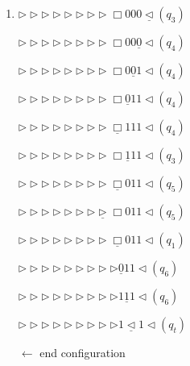 \documentclass[12pt,a4paper]{article}
\makeatletter
\newtheorem*{solution}{Solution}
\theoremstyle{definition}
\renewenvironment{solution}[1][Solution] {\par\pushQED{\qed}\normalfont\topsep6\p@\@plus6\p@\relax\trivlist\item[\hskip\labelsep\bfseries#1\@addpunct{.}]\ignorespaces}{\popQED\endtrivlist\@endpefalse} \makeatother
\makeatother
\begin{document}
\begin{enumerate}
\begin{solution}
\begin{minipage}{0.3\textwidth}
		$\triangleright\triangleright\triangleright\triangleright\triangleright\triangleright\triangleright\triangleright\Box000\underline{\triangleleft}(q_3)$
		
		$\triangleright\triangleright\triangleright\triangleright\triangleright\triangleright\triangleright\triangleright\Box00\underline{0}\triangleleft(q_4)$
		
		$\triangleright\triangleright\triangleright\triangleright\triangleright\triangleright\triangleright\triangleright\Box0\underline{0}1\triangleleft(q_4)$
		
		$\triangleright\triangleright\triangleright\triangleright\triangleright\triangleright\triangleright\triangleright\Box\underline{0}11\triangleleft(q_4)$
		
		$\triangleright\triangleright\triangleright\triangleright\triangleright\triangleright\triangleright\triangleright\underline{\Box}111\triangleleft(q_4)$

		$\triangleright\triangleright\triangleright\triangleright\triangleright\triangleright\triangleright\triangleright\Box\underline{1}11\triangleleft(q_3)$

	\end{minipage}
	\begin{minipage}{0.3\textwidth}
		\centering
		$\triangleright\triangleright\triangleright\triangleright\triangleright\triangleright\triangleright\triangleright\underline{\Box}011\triangleleft(q_5)$
		
		$\triangleright\triangleright\triangleright\triangleright\triangleright\triangleright\triangleright\underline{\triangleright}\Box011\triangleleft(q_5)$
		
		$\triangleright\triangleright\triangleright\triangleright\triangleright\triangleright\triangleright\triangleright\underline{\Box}011\triangleleft(q_1)$
		
		$\triangleright\triangleright\triangleright\triangleright\triangleright\triangleright\triangleright\triangleright\triangleright\underline{0}11\triangleleft(q_6)$
		
		$\triangleright\triangleright\triangleright\triangleright\triangleright\triangleright\triangleright\triangleright\triangleright1\underline{1}1\triangleleft(q_6)$
		
		$\triangleright\triangleright\triangleright\triangleright\triangleright\triangleright\triangleright\triangleright\triangleright1\underline{\triangleleft}1\triangleleft(q_t)$
		
		$\leftarrow$ end configuration
	\end{minipage}


\end{solution}
\end{enumerate}
\end{document}
